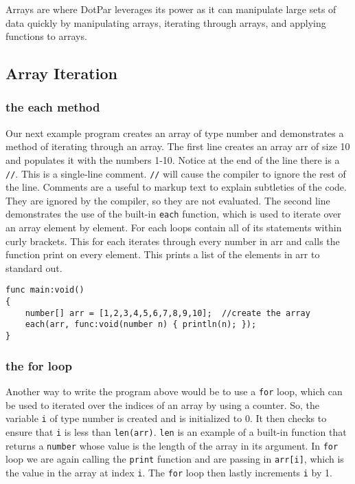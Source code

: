 Arrays are where DotPar leverages its power as it can manipulate large sets of data quickly by manipulating arrays, iterating through arrays, and applying functions to arrays. 

\subsection{Array Iteration}
\subsubsection{the each method}
Our next example program creates an array of type number and demonstrates a
method of iterating through an array. The first line creates an array arr of
size 10 and populates it with the numbers 1-10. Notice at the end of the line
there is a \verb=//=. This is a single-line comment. \verb=//= will cause the
compiler to ignore the rest of the line. Comments are a useful to markup text to
explain subtleties of the code. They are ignored by the compiler, so they are
not evaluated. The second line demonstrates the use of the built-in \verb=each=
function, which is used to iterate over an array element by element. For each
loops contain all of its statements within curly brackets.  This for each
iterates through every number in arr and calls the function print on every
element. This prints a list of the elements in arr to standard out.

\begin{verbatim}
func main:void()
{
    number[] arr = [1,2,3,4,5,6,7,8,9,10];  //create the array
    each(arr, func:void(number n) { println(n); });
}
\end{verbatim}

\subsubsection{the for loop}
Another way to write the program above would be to use a \verb=for= loop, which can be used to iterated over the indices of an array by using a counter. So, the variable \verb=i= of type number is created and is initialized to 0. It then checks to ensure that \verb=i= is less than \verb=len(arr)=. \verb=len= is an example of a built-in function that returns a \verb=number= whose value is the length of the array in its argument. In \verb=for= loop we are again calling the \verb=print= function and are passing in \verb=arr[i]=, which is the value in the array at index \verb=i=. The \verb=for= loop then lastly increments \verb=i= by 1.

